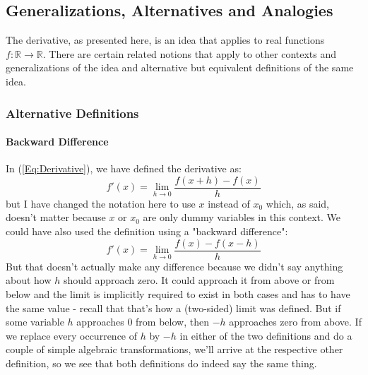 \subsection{Generalizations, Alternatives and Analogies}
The derivative, as presented here, is an idea that applies to real functions $f: \mathbb{R} \rightarrow \mathbb{R}$. There are certain related notions that apply to other contexts and generalizations of the idea and alternative but equivalent definitions of the same idea.

\subsubsection{Alternative Definitions}

\paragraph{Backward Difference}
In (\ref{Eq:Derivative}), we have defined the derivative as:
\begin{equation}
 f'(x) = \lim_{h \rightarrow 0} \frac{f(x + h) - f(x)}{h}
\end{equation}
but I have changed the notation here to use $x$ instead of $x_0$ which, as said, doesn't matter because $x$ or $x_0$ are only dummy variables in this context. We could have also used the definition using a "backward difference":
\begin{equation}
 f'(x) = \lim_{h \rightarrow 0} \frac{f(x) - f(x-h)}{h}
\end{equation}
But that doesn't actually make any difference because we didn't say anything about how $h$ should approach zero. It could approach it from above or from below and the limit is implicitly required to exist in both cases and has to have the same value - recall that that's how a (two-sided) limit was defined. But if some variable $h$ approaches $0$ from below, then $-h$ approaches zero from above. If we replace every occurrence of $h$ by $-h$ in either of the two definitions and do a couple of simple algebraic transformations, we'll arrive at the respective other definition, so we see that both definitions do indeed say the same thing.


